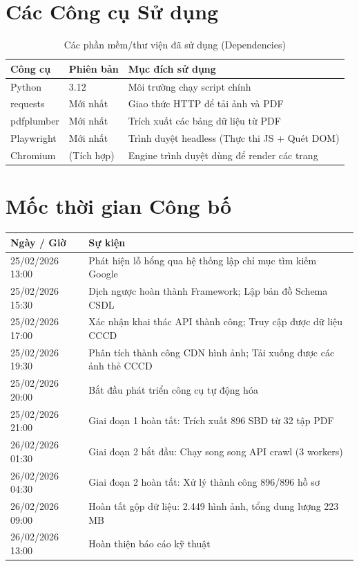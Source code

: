\documentclass[12pt,a4paper]{article}
\begin{document}
\appendix
\section{Các Công cụ Sử dụng}
\label{app:tools}

\begin{table}[H]
\centering
\caption{Các phần mềm/thư viện đã sử dụng (Dependencies)}
\begin{tabular}{@{}lll@{}}
\toprule
\textbf{Công cụ} & \textbf{Phiên bản} & \textbf{Mục đích sử dụng} \\
\midrule
Python & 3.12 & Môi trường chạy script chính \\
requests & Mới nhất & Giao thức HTTP để tải ảnh và PDF \\
pdfplumber & Mới nhất & Trích xuất các bảng dữ liệu từ PDF \\
Playwright & Mới nhất & Trình duyệt headless (Thực thi JS + Quét DOM) \\
Chromium & (Tích hợp) & Engine trình duyệt dùng để render các trang \\
\bottomrule
\end{tabular}
\end{table}

\section{Mốc thời gian Công bố}
\label{app:timeline}

\begin{table}[H]
\centering
\begin{tabular}{@{}p{3.5cm}p{10cm}@{}}
\toprule
\textbf{Ngày / Giờ} & \textbf{Sự kiện} \\
\midrule
25/02/2026 13:00 & Phát hiện lỗ hổng qua hệ thống lập chỉ mục tìm kiếm Google \\
25/02/2026 15:30 & Dịch ngược hoàn thành Framework; Lập bản đồ Schema CSDL \\
25/02/2026 17:00 & Xác nhận khai thác API thành công; Truy cập được dữ liệu CCCD \\
25/02/2026 19:30 & Phân tích thành công CDN hình ảnh; Tải xuống được các ảnh thẻ CCCD \\
25/02/2026 20:00 & Bắt đầu phát triển công cụ tự động hóa \\
25/02/2026 21:00 & Giai đoạn 1 hoàn tất: Trích xuất 896 SBD từ 32 tập PDF \\
26/02/2026 01:30 & Giai đoạn 2 bắt đầu: Chạy song song API crawl (3 workers) \\
26/02/2026 04:30 & Giai đoạn 2 hoàn tất: Xử lý thành công 896/896 hồ sơ \\
26/02/2026 09:00 & Hoàn tất gộp dữ liệu: 2.449 hình ảnh, tổng dung lượng 223 MB \\
26/02/2026 13:00 & Hoàn thiện báo cáo kỹ thuật \\
\bottomrule
\end{tabular}
\end{table}
\end{document}
